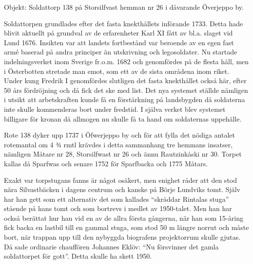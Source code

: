 %

\jhnooccupant{}

Objekt: Soldattorp 138 på Storsilfvast hemman nr 26 i dåvarande Överjeppo by.

Soldattorpen grundlades efter det fasta knekthållets införande 1733. Detta hade blivit aktuellt på grundval av de erfarenheter Karl XI fått av bl.a. slaget vid Lund 1676. Insikten var att landets fortbestånd var beroende av en egen fast armé baserad på andra principer än utskrivning och legosoldater. Nu startade indelningsverket inom Sverige fr.o.m. 1682 och genomfördes på de flesta håll, men i Österbotten stretade man emot, som ett av de sista områdena inom riket. Under kung Fredrik I genomfördes slutligen det fasta knekthållet också här, efter 50 års fördröjning och då  fick det ske med list. Det nya systemet ställde nämligen i utsikt att arbetskraften kunde få en förstärkning på landsbygden då soldaterna inte skulle kommenderas bort under fredstid. I själva verket blev systemet billigare för kronan då allmogen nu skulle få ta hand om soldaternas uppehälle.

Rote 138 dyker upp 1737 i Öfwerjeppo by och för att fylla det nödiga antalet rotemantal om 4 ¾ rmtl krävdes i detta sammanhang tre hemmans insatser, nämligen Måtare nr 28, Storsilfwast nr 26 och ännu Rautzinkåski nr 30. Torpet kallas då Sparfwas och senare 1752 för Sparfbacka och 1775 Måtars.

Exakt var torpstugans  fanns är något osäkert, men enighet råder att den stod nära Silvastbäcken i dagens centrum och kanske på Börje Lundviks tomt. Själv har han gett som ett alternativ det som kallades ``skräddar Rintalas stuga'' stående på hans tomt och som bortrevs i medlet av 1950-talet. Men han har också berättat hur han vid en av de allra första gångerna, när han som 15-åring fick backa en lastbil till en gammal stuga, som stod 50 m längre norrut och måste bort, när trappan upp till den nybyggda biografens projektorrum skulle gjutas. Då sade ordinarie chauffören Johannes Eklöv: ``Nu försvinner det gamla soldattorpet för gott''. Detta skulle ha skett 1950.


